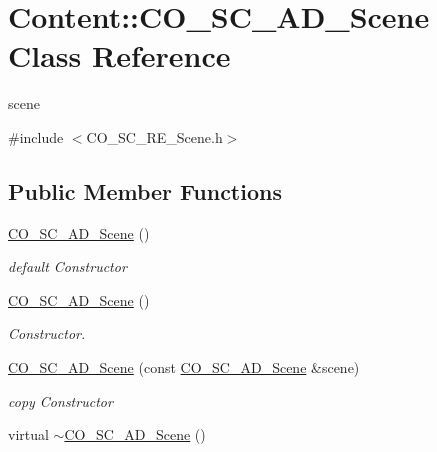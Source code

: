 \hypertarget{classContent_1_1CO__SC__AD__Scene}{
\section{Content::CO\_\-SC\_\-AD\_\-Scene Class Reference}
\label{classContent_1_1CO__SC__AD__Scene}
}


scene  


{\ttfamily \#include $<$CO\_\-SC\_\-RE\_\-Scene.h$>$}\subsection*{Public Member Functions}
\begin{DoxyCompactItemize}
\item 
\hypertarget{classContent_1_1CO__SC__AD__Scene_a402d7ac4270359299f7ef80b26050985}{
\hyperlink{classContent_1_1CO__SC__AD__Scene_a402d7ac4270359299f7ef80b26050985}{CO\_\-SC\_\-AD\_\-Scene} ()}
\label{classContent_1_1CO__SC__AD__Scene_a402d7ac4270359299f7ef80b26050985}

\begin{DoxyCompactList}\small\item\em default Constructor \item\end{DoxyCompactList}\item 
\hypertarget{classContent_1_1CO__SC__AD__Scene_a402d7ac4270359299f7ef80b26050985}{
\hyperlink{classContent_1_1CO__SC__AD__Scene_a402d7ac4270359299f7ef80b26050985}{CO\_\-SC\_\-AD\_\-Scene} ()}
\label{classContent_1_1CO__SC__AD__Scene_a402d7ac4270359299f7ef80b26050985}

\begin{DoxyCompactList}\small\item\em Constructor. \item\end{DoxyCompactList}\item 
\hypertarget{classContent_1_1CO__SC__AD__Scene_ad30039031a32207730fb164ac0981b72}{
\hyperlink{classContent_1_1CO__SC__AD__Scene_ad30039031a32207730fb164ac0981b72}{CO\_\-SC\_\-AD\_\-Scene} (const \hyperlink{classContent_1_1CO__SC__AD__Scene}{CO\_\-SC\_\-AD\_\-Scene} \&scene)}
\label{classContent_1_1CO__SC__AD__Scene_ad30039031a32207730fb164ac0981b72}

\begin{DoxyCompactList}\small\item\em copy Constructor \item\end{DoxyCompactList}\item 
\hypertarget{classContent_1_1CO__SC__AD__Scene_aed3b41cbfe1d5bdd3fa5ea80ac5a78d1}{
virtual \hyperlink{classContent_1_1CO__SC__AD__Scene_aed3b41cbfe1d5bdd3fa5ea80ac5a78d1}{$\sim$CO\_\-SC\_\-AD\_\-Scene} ()}
\label{classContent_1_1CO__SC__AD__Scene_aed3b41cbfe1d5bdd3fa5ea80ac5a78d1}


\end{DoxyCompactItemize}
